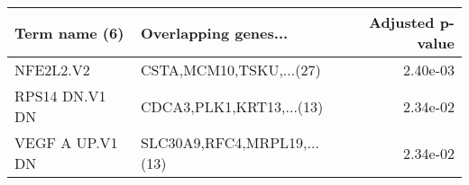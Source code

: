 \begin{tabular}{llr}
\toprule
  Term name (6) &        Overlapping genes... &  Adjusted p-value \\
\midrule
      NFE2L2.V2 &     CSTA,MCM10,TSKU,...(27) &          2.40e-03 \\
 RPS14 DN.V1 DN &    CDCA3,PLK1,KRT13,...(13) &          2.34e-02 \\
VEGF A UP.V1 DN & SLC30A9,RFC4,MRPL19,...(13) &          2.34e-02 \\
\bottomrule
\end{tabular}
